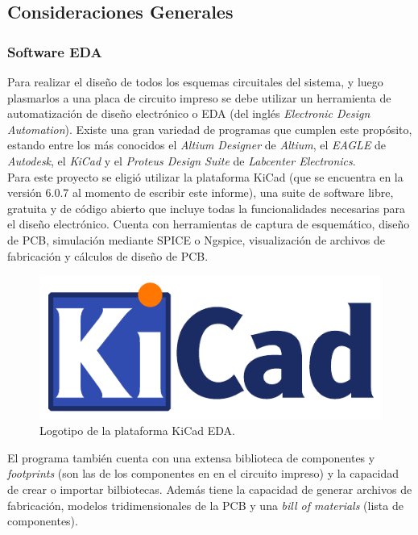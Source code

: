 \subsection{Consideraciones Generales}

\subsubsection{Software EDA}

Para realizar el diseño de todos los esquemas circuitales del sistema, y luego plasmarlos a una placa de circuito impreso se debe utilizar un herramienta de automatización de diseño electrónico o EDA (del inglés \textit{Electronic Design Automation}). Existe una gran variedad de programas que cumplen este propósito, estando entre los más conocidos el \textit{Altium Designer} de \textit{Altium}, el \textit{EAGLE} de \textit{Autodesk}, el \textit{KiCad} y el \textit{Proteus Design Suite} de \textit{Labcenter Electronics}.\\

Para este proyecto se eligió utilizar la plataforma {\Medium KiCad} (que se encuentra en la versión 6.0.7 al momento de escribir este informe), una suite de software libre, gratuita y de código abierto que incluye todas la funcionalidades necesarias para el diseño electrónico. Cuenta con herramientas de captura de esquemático, diseño de PCB, simulación mediante SPICE o Ngspice, visualización de archivos de fabricación y cálculos de diseño de PCB.\\

\begin{figure}[h]
    \centering
    \includegraphics[scale=0.6]{Imagenes/KiCad.pdf}
    \caption{Logotipo de la plataforma KiCad EDA.}
    \label{logo_kicad}
\end{figure}

El programa también cuenta con una extensa biblioteca de componentes y \textit{footprints} (son las  de los componentes en en el circuito impreso) y la capacidad de crear o importar bilbiotecas. Además tiene la capacidad de generar archivos de fabricación, modelos tridimensionales de la PCB y una \textit{bill of materials} (lista de componentes).\\


